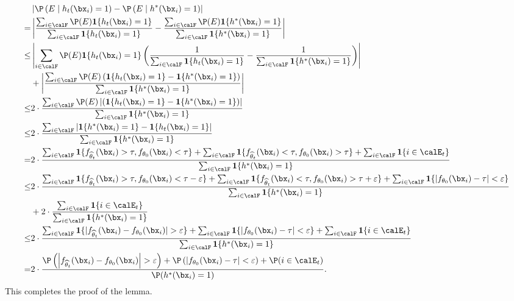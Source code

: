 \documentclass[blindrev]{informs3noheader}
\begin{document}
\begin{align*}
& \left|\P\left(E \mid h_t(\bx_i)=1\right)- \P\left(E \mid h^*(\bx_i)=1\right)\right|\\
=& \left|\frac{\sum_{i\in\calF} \P(E)\mathbf{1}\{h_t(\bx_i)=1\}}{\sum_{i\in\calF} \mathbf{1}\{h_t(\bx_i)=1\}}-\frac{\sum_{i\in\calF} \P(E)\mathbf{1}\{h^*(\bx_i)=1\}}{\sum_{i\in\calF} \mathbf{1}\{h^*(\bx_i)=1\}}\right| \\   
\leq& \left|\sum_{i\in\calF} \P(E)\mathbf{1}\{h_t(\bx_i)=1\}\left(\frac{1}{\sum_{i\in\calF} \mathbf{1}\{h_t(\bx_i)=1\}}-\frac{1}{\sum_{i\in\calF} \mathbf{1}\{h^*(\bx_i)=1\}}\right)\right|\\&+\left|\frac{\sum_{i\in\calF}  \P(E)\left(\mathbf{1}\{h_t(\bx_i)=1\}-\mathbf{1}\{h^*(\bx_i)=1\}\right)}{\sum_{i\in\calF} \mathbf{1}\{h^*(\bx_i)=1\}}\right|\\
\leq & 2\cdot\frac{\sum_{i\in\calF} \P(E)\left|\left(\mathbf{1}\{h_t(\bx_i)=1\}-\mathbf{1}\{h^*(\bx_i)=1\}\right)\right|}{\sum_{i\in\calF} \mathbf{1}\{h^*(\bx_i)=1\}} \\
\leq & 2\cdot \frac{\sum_{i\in\calF} |\mathbf{1}\{h^*(\bx_i)=1\}- \mathbf{1}\{h_t(\bx_i)=1\}|}{\sum_{i\in\calF} \mathbf{1}\{h^*(\bx_i)=1\}}\\
= & 2\cdot \frac{\sum_{i\in\calF}\mathbf{1}\{f_{\widehat\theta_t}(\bx_i) > \tau, f_{\theta_0}(\bx_i) < \tau\}+\sum_{i\in\calF}\mathbf{1}\{f_{\widehat\theta_t}(\bx_i) <\tau, f_{\theta_0}(\bx_i) >\tau\}+\sum_{i\in\calF}\mathbf{1}\{i \in \calE_t\}}{\sum_{i\in\calF} \mathbf{1}\{h^*(\bx_i)=1\}}\\
\leq & 2\cdot \frac{\sum_{i\in\calF}\mathbf{1}\{f_{\widehat\theta_t}(\bx_i) > \tau, f_{\theta_0}(\bx_i) < \tau-\varepsilon \}+\sum_{i\in\calF}\mathbf{1}\{f_{\widehat\theta_t}(\bx_i) <\tau, f_{\theta_0}(\bx_i) >\tau+\varepsilon\}+\sum_{i\in\calF}\mathbf{1}\{\left|f_{\theta_0}(\bx_i) - \tau\right| < \varepsilon\}}{\sum_{i\in\calF} \mathbf{1}\{h^*(\bx_i)=1\}}\\
& + 2\cdot \frac{\sum_{i\in\calF}\mathbf{1}\{i \in \calE_t\}}{\sum_{i\in\calF} \mathbf{1}\{h^*(\bx_i)=1\}}\\
\leq & 2\cdot \frac{\sum_{i\in\calF}\mathbf{1}\{|f_{\widehat\theta_t}(\bx_i)-f_{\theta_0}(\bx_i)|>\varepsilon\}+\sum_{i\in\calF}\mathbf{1}\{\left|f_{\theta_0}(\bx_i) - \tau\right| < \varepsilon\}+\sum_{i\in\calF}\mathbf{1}\{i \in \calE_t\}}{\sum_{i\in\calF} \mathbf{1}\{h^*(\bx_i)=1\}}\\
=& 2\cdot\frac{\P\left( \left|f_{\widehat\theta_t}(\bx_i) - f_{\theta_0}(\bx_i)\right| > \varepsilon \right)+\P\left( \left|f_{\theta_0}(\bx_i) - \tau\right| < \varepsilon \right)+\P(i \in \calE_t)}{\P(h^*(\bx_i)=1)}.
\end{align*}
This completes the proof of the lemma.
\hfill\Halmos
\end{document}
